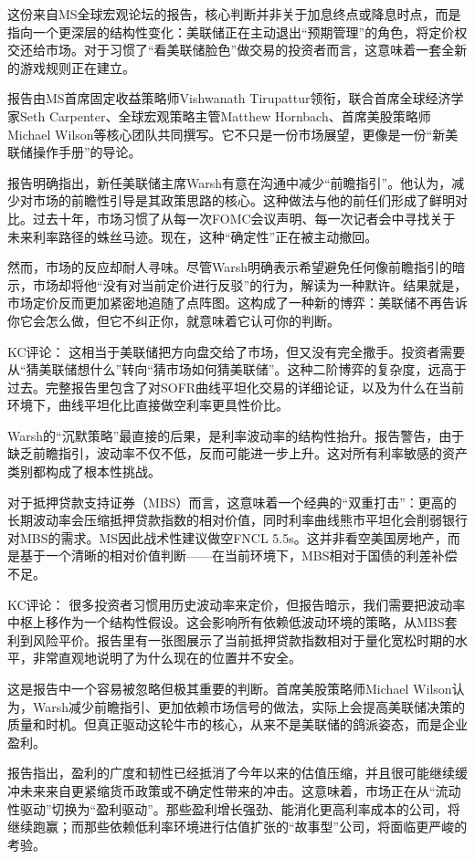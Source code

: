 \documentclass[11pt]{ctexart}
\begin{document}
这份来自MS全球宏观论坛的报告，核心判断并非关于加息终点或降息时点，而是指向一个更深层的结构性变化：美联储正在主动退出“预期管理”的角色，将定价权交还给市场。对于习惯了“看美联储脸色”做交易的投资者而言，这意味着一套全新的游戏规则正在建立。

报告由MS首席固定收益策略师Vishwanath Tirupattur领衔，联合首席全球经济学家Seth Carpenter、全球宏观策略主管Matthew Hornbach、首席美股策略师Michael Wilson等核心团队共同撰写。它不只是一份市场展望，更像是一份“新美联储操作手册”的导论。

报告明确指出，新任美联储主席Warsh有意在沟通中减少“前瞻指引”。他认为，减少对市场的前瞻性引导是其政策思路的核心。这种做法与他的前任们形成了鲜明对比。过去十年，市场习惯了从每一次FOMC会议声明、每一次记者会中寻找关于未来利率路径的蛛丝马迹。现在，这种“确定性”正在被主动撤回。

然而，市场的反应却耐人寻味。尽管Warsh明确表示希望避免任何像前瞻指引的暗示，市场却将他“没有对当前定价进行反驳”的行为，解读为一种默许。结果就是，市场定价反而更加紧密地追随了点阵图。这构成了一种新的博弈：美联储不再告诉你它会怎么做，但它不纠正你，就意味着它认可你的判断。

KC评论： 这相当于美联储把方向盘交给了市场，但又没有完全撒手。投资者需要从“猜美联储想什么”转向“猜市场如何猜美联储”。这种二阶博弈的复杂度，远高于过去。完整报告里包含了对SOFR曲线平坦化交易的详细论证，以及为什么在当前环境下，曲线平坦化比直接做空利率更具性价比。

Warsh的“沉默策略”最直接的后果，是利率波动率的结构性抬升。报告警告，由于缺乏前瞻指引，波动率不仅不低，反而可能进一步上升。这对所有利率敏感的资产类别都构成了根本性挑战。

对于抵押贷款支持证券（MBS）而言，这意味着一个经典的“双重打击”：更高的长期波动率会压缩抵押贷款指数的相对价值，同时利率曲线熊市平坦化会削弱银行对MBS的需求。MS因此战术性建议做空FNCL 5.5s。这并非看空美国房地产，而是基于一个清晰的相对价值判断——在当前环境下，MBS相对于国债的利差补偿不足。

KC评论： 很多投资者习惯用历史波动率来定价，但报告暗示，我们需要把波动率中枢上移作为一个结构性假设。这会影响所有依赖低波动环境的策略，从MBS套利到风险平价。报告里有一张图展示了当前抵押贷款指数相对于量化宽松时期的水平，非常直观地说明了为什么现在的位置并不安全。

这是报告中一个容易被忽略但极其重要的判断。首席美股策略师Michael Wilson认为，Warsh减少前瞻指引、更加依赖市场信号的做法，实际上会提高美联储决策的质量和时机。但真正驱动这轮牛市的核心，从来不是美联储的鸽派姿态，而是企业盈利。

报告指出，盈利的广度和韧性已经抵消了今年以来的估值压缩，并且很可能继续缓冲未来来自更紧缩货币政策或不确定性带来的冲击。这意味着，市场正在从“流动性驱动”切换为“盈利驱动”。那些盈利增长强劲、能消化更高利率成本的公司，将继续跑赢；而那些依赖低利率环境进行估值扩张的“故事型”公司，将面临更严峻的考验。
\end{document}
